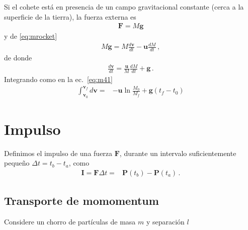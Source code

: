Si el cohete está en presencia de un campo gravitacional constante (cerca a la superficie de la tierra), la fuerza externa es
\begin{align}
  \mathbf{F}=M\mathbf{g}
\end{align}
y de \eqref{eq:mrocket}
\begin{align}
     M\mathbf{g}=M\frac{d\mathbf{v}}{dt}-\mathbf{u}\frac{dM}{dt}\,,
\end{align}
de donde
\begin{align}
  \frac{d\mathbf{v}}{dt}=\frac{\mathbf{u}}{M}\frac{dM}{dt}+\mathbf{g}\,.
\end{align}
Integrando como en la ec.~\eqref{eq:m41}
\begin{align}
   \int_{\mathbf{v}_0}^{\mathbf{v}_f}{d\mathbf{v}}=&
   -\mathbf{u}\ln\frac{M_0}{M_f}+\mathbf{g}(t_f-t_0)
\end{align}






\section{Impulso}
Definimos el impulso de una fuerza $\mathbf{F}$, durante un intervalo suficientemente pequeño $\Delta t=t_b-t_a$, como
\begin{align}
   \mathbf{I}=\mathbf{F}\Delta t=&\mathbf{P}(t_b)-\mathbf{P}(t_a)\,.
\end{align}

\subsection{Transporte de momomentum}

Considere un chorro de partículas de masa $m$ y separación $l$

